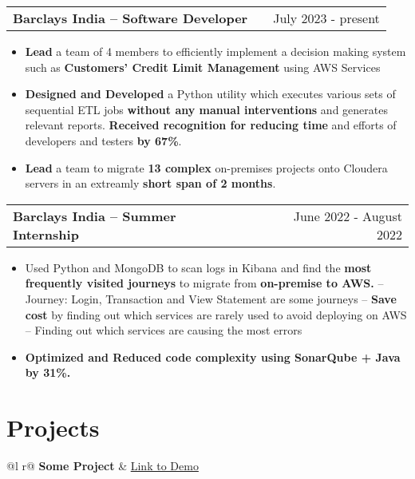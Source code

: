 \documentclass[a4paper,12pt]{article}
\makeatletter
\newenvironment{joblong}[2]
    {
    \begin{tabularx}{\linewidth}{@{}l X r@{}}
    \textbf{#1} & \hfill &  #2 \\[3.75pt]
    \end{tabularx}
    \begin{minipage}[t]{\linewidth}
    \begin{itemize}[nosep,after=\strut, leftmargin=1em, itemsep=3pt,label=--]
    }
    {
    \end{itemize}
    \end{minipage}    
    }
\makeatother
\begin{document}
\begin{joblong}{Barclays India -- Software Developer}{July 2023 - present}
\item \textbf{Lead} a team of 4 members to efficiently implement a decision making system such as \textbf{Customers' Credit Limit Management} using AWS Services   
\item \textbf{Designed and Developed} a Python utility which executes various sets of sequential ETL jobs \textbf{without any manual interventions} and generates relevant reports. \textbf{Received recognition for reducing time} and efforts of developers and testers \textbf{by 67\%}.  
\item \textbf{Lead} a team to migrate \textbf{13 complex} on-premises projects onto Cloudera servers in an extreamly \textbf{short span of 2 months}. 
\end{joblong}

\begin{joblong}{Barclays India -- Summer Internship}{June 2022 - August 2022}
\item Used Python and MongoDB to scan logs in Kibana and find the \textbf{most frequently visited journeys} to migrate from \textbf{on-premise to AWS.}
\subitem -- Journey: Login, Transaction and View Statement are some journeys
\subitem -- \textbf{Save cost} by finding out which services are rarely used to avoid deploying on AWS
\subitem -- Finding out which services are causing the most errors
\item \textbf{Optimized and Reduced code complexity using SonarQube + Java by 31\%.}
\end{joblong}

\section{Projects}

\begin{tabularx}{\linewidth}{ @{}l r@{} }
\textbf{Some Project} & \hfill \href{https://some-link.com}{Link to Demo} \\[3.75pt]
  \\
\end{tabularx}
\end{document}
